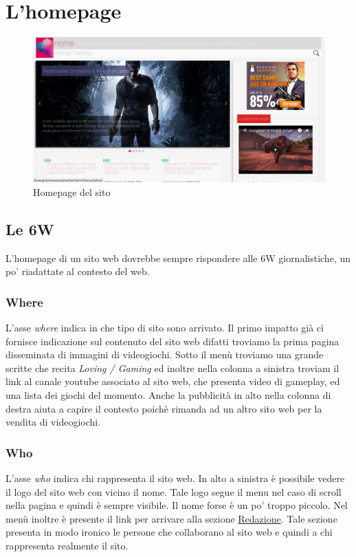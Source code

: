 \documentclass[../ProgettoTecWeb2.tex]{subfiles}
\begin{document}
\section{L'homepage}
	\begin{figure} [H]
		\centering
		\includegraphics[scale=0.3]{img/ScreenHomePage}
		\caption{Homepage del sito}
	\end{figure}
	\subsection{Le 6W}
		L'homepage di un sito web dovrebbe sempre rispondere alle 6W giornalistiche, un po' riadattate al contesto del web.
		\subsubsection{Where}
			L'asse \textit{where} indica in che tipo di sito sono arrivato. Il primo impatto già ci fornisce indicazione sul contenuto del sito web difatti troviamo la prima pagina disseminata di immagini di videogiochi. Sotto il menù troviamo una grande scritte che recita \textit{Loving / Gaming} ed inoltre nella colonna a sinistra troviam il link al canale youtube associato al sito web, che presenta video di gameplay, ed una lista dei giochi del momento. Anche la pubblicità in alto nella colonna di destra aiuta a capire il contesto poichè rimanda ad un altro sito web per la vendita di videogiochi.
		\subsubsection{Who}
			L'asse \textit{who} indica chi rappresenta il sito web. In alto a sinistra è possibile vedere il logo del sito web con vicino il nome. Tale logo segue il menu nel caso di scroll nella pagina e quindi è sempre visibile. Il nome forse è un po' troppo piccolo. Nel menù inoltre è presente il link per arrivare alla sezione \href{http://ilovevg.it/redazione/}{Redazione}. Tale sezione presenta in modo ironico le persone che collaborano al sito web e quindi a chi rappresenta realmente il sito.
\end{document}
